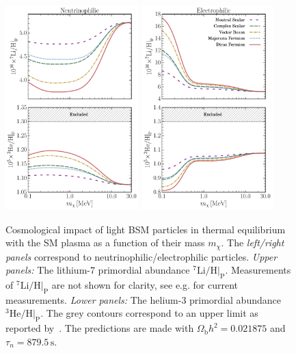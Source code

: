 \begin{figure}[!ht]
    \centering
    \includegraphics[width=0.46\textwidth]{figures/Nu_extra_abundance_plot.pdf} \qquad
    \includegraphics[width=0.45\textwidth]{figures/EE_extra_abundance_plot.pdf}
    \caption{Cosmological impact of light BSM particles in thermal equilibrium with the SM plasma as a function of their mass $m_\chi$. The \textit{left/right panels} correspond to neutrinophilic/electrophilic particles. \textit{Upper panels:} The lithium-7 primordial abundance $^7\mathrm{Li}/\mathrm{H}|_{\mathrm{P}}$. Measurements of $^7\mathrm{Li}/\mathrm{H}|_{\mathrm{P}}$ are not shown for clarity, see e.g. \cite{pdg} for current measurements. \textit{Lower panels:} The helium-3 primordial abundance $^3\mathrm{He}/\mathrm{H}|_{\mathrm{P}}$. The grey contours correspond to an upper limit as reported by~\cite{Bania:2002yj}. The predictions are made with $\Omega_{\mathrm{b}} h^2 = 0.021875$ and $\tau_n = 879.5\,\text{s}$.}
    \label{fig:Cosmoimply_other}
\end{figure}

